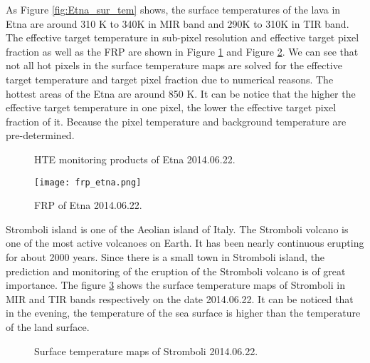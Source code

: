 \noindent As Figure \ref{fig:Etna_sur_tem} shows, the surface temperatures of the lava in Etna are around 310 K to 340K in MIR band and 290K to 310K in TIR band. The effective target temperature in sub-pixel resolution and effective target pixel fraction as well as the FRP are shown in Figure \ref{fig:Etna_HTE} and Figure \ref{fig:Etna_frp}. We can see that not all hot pixels in the surface temperature maps are solved for the effective target temperature and target pixel fraction due to numerical reasons. The hottest areas of the Etna are around 850 K. It can be notice that the higher the effective target temperature in one pixel, the lower the effective target pixel fraction of it. Because the pixel temperature and background temperature are pre-determined.\\

\begin{figure}[!htbp]
\centering
{}
\hspace{0.1in}
\caption{HTE monitoring products of Etna 2014.06.22.}
\label{fig:Etna_HTE}
\end{figure}

\begin{figure}[!htbp]
\centering
\texttt{[image: frp\_etna.png]}
\caption{FRP of Etna 2014.06.22.}
\label{fig:Etna_frp}
\end{figure}

\noindent Stromboli island is one of the Aeolian island of Italy. The Stromboli volcano is one of the most active volcanoes on Earth. It has been nearly continuous erupting for about 2000 years. Since there is a small town in Stromboli island, the prediction and monitoring of the eruption of the Stromboli volcano is of great importance. The figure \ref{fig:Strom_sur_tem} shows the surface temperature maps of Stromboli in MIR and TIR bands respectively on the date 2014.06.22. It can be noticed that in the evening, the temperature of the sea surface is higher than the temperature of the land surface.\\

\begin{figure}
\centering
{}
\hspace{0.1in}
\caption{Surface temperature maps of Stromboli 2014.06.22.}
\label{fig:Strom_sur_tem}
\end{figure}


